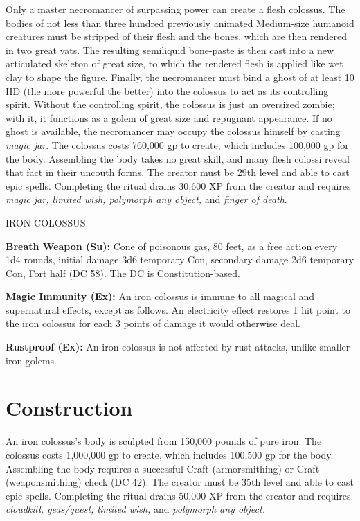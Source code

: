 \documentclass{article}
\begin{document}
Only a master necromancer of surpassing power can create a flesh colossus. The 
bodies of not less than three hundred previously animated Medium-size humanoid 
creatures must be stripped of their flesh and the bones, which are then rendered 
in two great vats. The resulting semiliquid bone-paste is then cast into a new 
articulated skeleton of great size, to which the rendered flesh is applied like 
wet clay to shape the figure. Finally, the necromancer must bind a ghost of at 
least 10 HD (the more powerful the better) into the colossus to act as its controlling 
spirit. Without the controlling spirit, the colossus is just an oversized zombie; 
with it, it functions as a golem of great size and repugnant appearance. If no 
ghost is available, the necromancer may occupy the colossus himself by casting 
\textit{magic jar}. The colossus costs 760,000 gp to create, which includes 100,000 
gp for the body. Assembling the body takes no great skill, and many flesh colossi 
reveal that fact in their uncouth forms. The creator must be 29th level and able 
to cast epic spells. Completing the ritual drains 30,600 XP from the creator and 
requires \textit{magic jar, limited wish, polymorph any object, }and \textit{finger 
of death}. 

IRON COLOSSUS 

\textbf{Breath Weapon (Su):} Cone of poisonous gas, 80 feet, as a free action every 
1d4 rounds, initial damage 3d6 temporary Con, secondary damage 2d6 temporary Con, 
Fort half (DC 58). The DC is Constitution-based.

\textbf{Magic Immunity (Ex):} An iron colossus is immune to all magical and supernatural 
effects, except as follows. An electricity effect restores 1 hit point to the iron 
colossus for each 3 points of damage it would otherwise deal. 

\textbf{Rustproof (Ex):} An iron colossus is not affected by rust attacks, unlike 
smaller iron golems. 

\section*{\textbf{Construction }}

An iron colossus's body is sculpted from 150,000 pounds of pure iron. The colossus 
costs 1,000,000 gp to create, which includes 100,500 gp for the body. Assembling 
the body requires a successful Craft (armorsmithing) or Craft (weaponsmithing) 
check (DC 42). The creator must be 35th level and able to cast epic spells. Completing 
the ritual drains 50,000 XP from the creator and requires \textit{cloudkill, geas/quest, 
limited wish, }and \textit{polymorph any object. }
\end{document}
